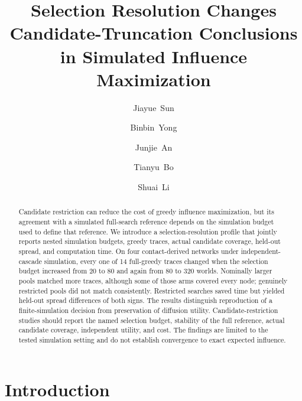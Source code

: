 \documentclass[smallextended]{svjour3}
\begin{document}
\title{Selection Resolution Changes Candidate-Truncation Conclusions in Simulated Influence Maximization}
\author{\mbox{Jiayue Sun} \and \mbox{Binbin Yong} \and \mbox{Junjie An} \and \mbox{Tianyu Bo} \and \mbox{Shuai Li}}
\date{}
\maketitle
\begin{abstract}
Candidate restriction can reduce the cost of greedy influence maximization, but its agreement with a simulated full-search reference depends on the simulation budget used to define that reference. We introduce a selection-resolution profile that jointly reports nested simulation budgets, greedy traces, actual candidate coverage, held-out spread, and computation time. On four contact-derived networks under independent-cascade simulation, every one of 14 full-greedy traces changed when the selection budget increased from 20 to 80 and again from 80 to 320 worlds. Nominally larger pools matched more traces, although some of those arms covered every node; genuinely restricted pools did not match consistently. Restricted searches saved time but yielded held-out spread differences of both signs. The results distinguish reproduction of a finite-simulation decision from preservation of diffusion utility. Candidate-restriction studies should report the named selection budget, stability of the full reference, actual candidate coverage, independent utility, and cost. The findings are limited to the tested simulation setting and do not establish convergence to exact expected influence.
\end{abstract}



\section{Introduction}
\end{document}
